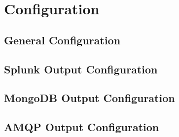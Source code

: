 \chapter{Configuration}


\section{General Configuration}
\section{Splunk Output Configuration}
\section{MongoDB Output Configuration}
\section{AMQP Output Configuration}
